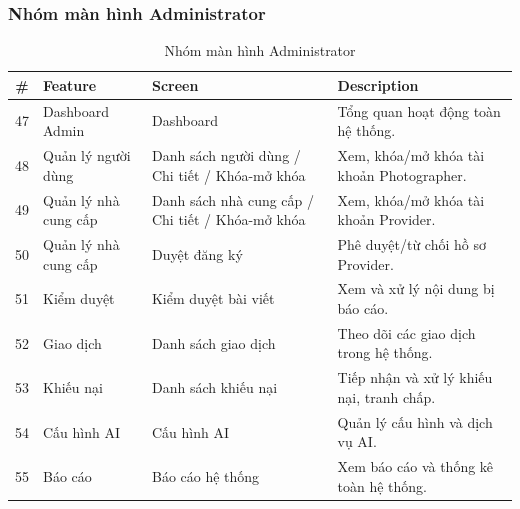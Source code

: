 \subsubsection{Nhóm màn hình Administrator}
\begin{table}[H]
	\centering
	\begin{tabular}{|c|p{3cm}|p{4cm}|p{6cm}|}
		\hline
		\textbf{\#} & \textbf{Feature} & \textbf{Screen} & \textbf{Description} \\
		\hline
		47 & Dashboard Admin & Dashboard &
		Tổng quan hoạt động toàn hệ thống. \\
		\hline
		48 & Quản lý người dùng & Danh sách người dùng / Chi tiết / Khóa-mở khóa &
		Xem, khóa/mở khóa tài khoản Photographer. \\
		\hline
		49 & Quản lý nhà cung cấp & Danh sách nhà cung cấp / Chi tiết / Khóa-mở khóa &
		Xem, khóa/mở khóa tài khoản Provider. \\
		\hline
		50 & Quản lý nhà cung cấp & Duyệt đăng ký &
		Phê duyệt/từ chối hồ sơ Provider. \\
		\hline
		51 & Kiểm duyệt & Kiểm duyệt bài viết &
		Xem và xử lý nội dung bị báo cáo. \\
		\hline
		52 & Giao dịch & Danh sách giao dịch &
		Theo dõi các giao dịch trong hệ thống. \\
		\hline
		53 & Khiếu nại & Danh sách khiếu nại &
		Tiếp nhận và xử lý khiếu nại, tranh chấp. \\
		\hline
		54 & Cấu hình AI & Cấu hình AI &
		Quản lý cấu hình và dịch vụ AI. \\
		\hline
		55 & Báo cáo & Báo cáo hệ thống &
		Xem báo cáo và thống kê toàn hệ thống. \\
		\hline
	\end{tabular}
	\caption{Nhóm màn hình Administrator}
	\label{tab:administrator-screen-descriptions}
\end{table}
